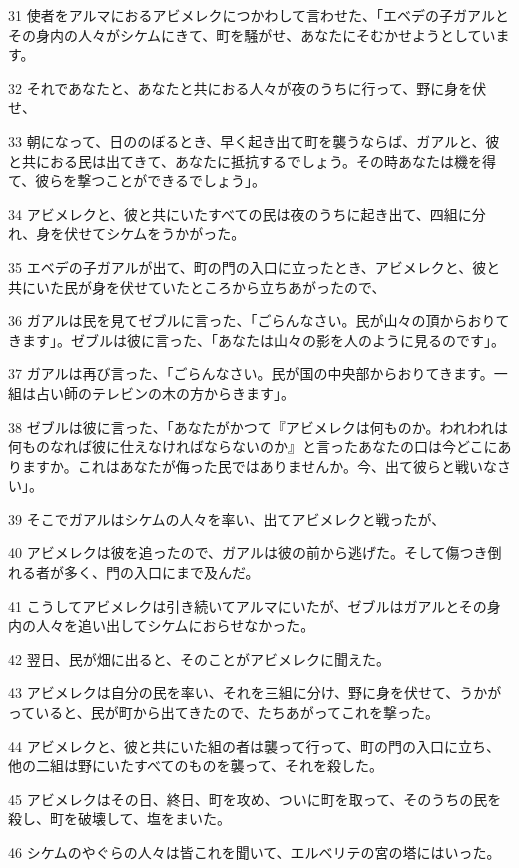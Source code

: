 \par 31 使者をアルマにおるアビメレクにつかわして言わせた、「エベデの子ガアルとその身内の人々がシケムにきて、町を騒がせ、あなたにそむかせようとしています。
\par 32 それであなたと、あなたと共におる人々が夜のうちに行って、野に身を伏せ、
\par 33 朝になって、日ののぼるとき、早く起き出て町を襲うならば、ガアルと、彼と共におる民は出てきて、あなたに抵抗するでしょう。その時あなたは機を得て、彼らを撃つことができるでしょう」。
\par 34 アビメレクと、彼と共にいたすべての民は夜のうちに起き出て、四組に分れ、身を伏せてシケムをうかがった。
\par 35 エベデの子ガアルが出て、町の門の入口に立ったとき、アビメレクと、彼と共にいた民が身を伏せていたところから立ちあがったので、
\par 36 ガアルは民を見てゼブルに言った、「ごらんなさい。民が山々の頂からおりてきます」。ゼブルは彼に言った、「あなたは山々の影を人のように見るのです」。
\par 37 ガアルは再び言った、「ごらんなさい。民が国の中央部からおりてきます。一組は占い師のテレビンの木の方からきます」。
\par 38 ゼブルは彼に言った、「あなたがかつて『アビメレクは何ものか。われわれは何ものなれば彼に仕えなければならないのか』と言ったあなたの口は今どこにありますか。これはあなたが侮った民ではありませんか。今、出て彼らと戦いなさい」。
\par 39 そこでガアルはシケムの人々を率い、出てアビメレクと戦ったが、
\par 40 アビメレクは彼を追ったので、ガアルは彼の前から逃げた。そして傷つき倒れる者が多く、門の入口にまで及んだ。
\par 41 こうしてアビメレクは引き続いてアルマにいたが、ゼブルはガアルとその身内の人々を追い出してシケムにおらせなかった。
\par 42 翌日、民が畑に出ると、そのことがアビメレクに聞えた。
\par 43 アビメレクは自分の民を率い、それを三組に分け、野に身を伏せて、うかがっていると、民が町から出てきたので、たちあがってこれを撃った。
\par 44 アビメレクと、彼と共にいた組の者は襲って行って、町の門の入口に立ち、他の二組は野にいたすべてのものを襲って、それを殺した。
\par 45 アビメレクはその日、終日、町を攻め、ついに町を取って、そのうちの民を殺し、町を破壊して、塩をまいた。
\par 46 シケムのやぐらの人々は皆これを聞いて、エルベリテの宮の塔にはいった。
